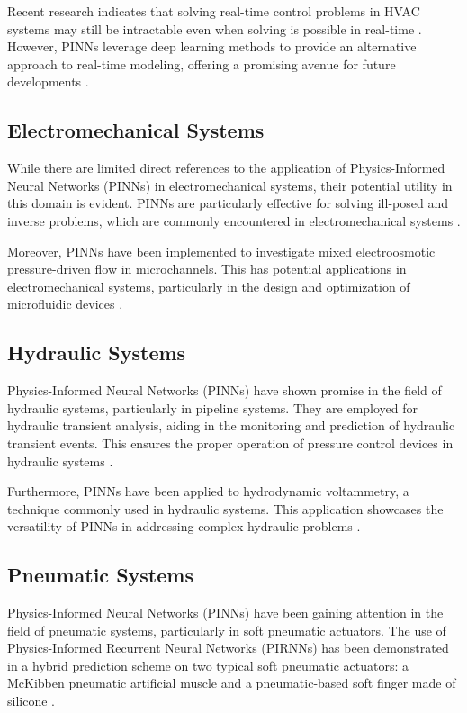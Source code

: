 \documentclass[12pt]{article}
\begin{document}
	Recent research indicates that solving real-time control problems in HVAC systems may still be intractable even when solving is possible in real-time \cite{nature-hvac1}. However, PINNs leverage deep learning methods to provide an alternative approach to real-time modeling, offering a promising avenue for future developments \cite{nature-hvac2}.
		
	\subsection{Electromechanical Systems}
	While there are limited direct references to the application of Physics-Informed Neural Networks (PINNs) in electromechanical systems, their potential utility in this domain is evident. PINNs are particularly effective for solving ill-posed and inverse problems, which are commonly encountered in electromechanical systems \cite{nature-electromechanical}. 
	
	Moreover, PINNs have been implemented to investigate mixed electroosmotic pressure-driven flow in microchannels. This has potential applications in electromechanical systems, particularly in the design and optimization of microfluidic devices \cite{sciencedirect-electromechanical}.
		
	\subsection{Hydraulic Systems}
	Physics-Informed Neural Networks (PINNs) have shown promise in the field of hydraulic systems, particularly in pipeline systems. They are employed for hydraulic transient analysis, aiding in the monitoring and prediction of hydraulic transient events. This ensures the proper operation of pressure control devices in hydraulic systems \cite{sciencedirect-hydraulic}. 
	
	Furthermore, PINNs have been applied to hydrodynamic voltammetry, a technique commonly used in hydraulic systems. This application showcases the versatility of PINNs in addressing complex hydraulic problems \cite{researchgate-hydraulic}.
	
	\subsection{Pneumatic Systems}
	Physics-Informed Neural Networks (PINNs) have been gaining attention in the field of pneumatic systems, particularly in soft pneumatic actuators. The use of Physics-Informed Recurrent Neural Networks (PIRNNs) has been demonstrated in a hybrid prediction scheme on two typical soft pneumatic actuators: a McKibben pneumatic artificial muscle and a pneumatic-based soft finger made of silicone \cite{ieee-pneumatic}. 
	
\end{document}
